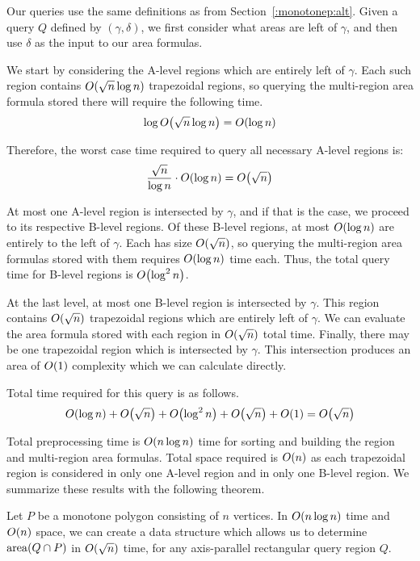 {Our queries use the same definitions as from Section~\ref{:monotonep:alt}. 
Given a query $Q$ defined by $(\gamma, \delta)$, we first consider what areas 
are left of $\gamma$, and then use $\delta$ as the input to our area formulas.

We start by considering the A-level regions which are entirely left of 
$\gamma$. 
Each such region contains $O\!\left(\sqrt{n}\log{n}\right)$ trapezoidal regions, so 
querying the multi-region area formula stored there will require the following 
time.
\[
\log{O\!\left(\sqrt{n}\log{n}\right)} = O\!\left(\log{n}\right)
\]

  Therefore, the worst case time required to query all necessary A-level regions 
is:
\[
\frac{\sqrt{n}}{\log{n}} \cdot O\!\left(\log{n}\right) = O\!\left(\sqrt{n}\right)
\]

  At most one A-level region is intersected by $\gamma$, and if that is the 
case, we proceed to its respective B-level regions.
Of these B-level regions, at most $O\!\left(\log{n}\right)$ are entirely to the left of 
$\gamma$.
Each has size $O\!\left(\sqrt{n}\right)$, so querying the multi-region area formulas 
stored with them requires $O\!\left(\log{n}\right)$ time each. Thus, the total query 
time for B-level regions is $O\!\left(\log^2{n}\right)$.

At the last level, at most one B-level region is intersected by $\gamma$. 
This region contains $O\!\left(\sqrt{n}\right)$ trapezoidal regions which are entirely 
left of $\gamma$.
We can evaluate the area formula stored with each region in $O\!\left(\sqrt{n}\right)$ 
total time.
Finally, there may be one trapezoidal region which is intersected by $\gamma$.
This intersection produces an area of $O\!\left(1\right)$ complexity which we can 
calculate directly.

Total time required for this query is as follows.
\[
O\!\left(\log{n}\right) + O\!\left(\sqrt{n}\right) + O\!\left(\log^2{n}\right) + O\!\left(\sqrt{n}\right) + 
O\!\left(1\right) = O\!\left(\sqrt{n}\right)
\]

  Total preprocessing time is $O\!\left(n \log{n}\right)$ time for sorting and building 
the region and multi-region area formulas.  
Total space required is $O\!\left(n\right)$ as each trapezoidal region is considered in 
only one A-level region and in only one B-level region. 
We summarize these results with the following theorem.

\begin{theorem}
\label{th:mono2}
Let $P$ be a monotone polygon consisting of $n$ vertices. 
In $O\!\left(n \log{n}\right)$ time and $O\!\left(n\right)$ space, we can create a data 
structure which allows us to determine $\operatorname{area}\!\left(Q \cap P\right)$ in $O\!\left(\sqrt{n}\right)$ 
time, for any axis-parallel rectangular query region $Q$.
\end{theorem}
}


